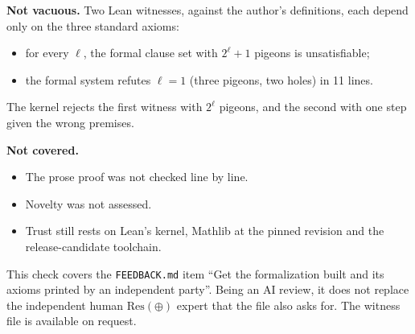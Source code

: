 \documentclass[10pt]{article}
\begin{document}
\textbf{Not vacuous.} Two Lean witnesses, against the author's definitions,
each depend only on the three standard axioms:
\begin{itemize}
\item for every $\ell$, the formal clause set with $2^\ell+1$ pigeons is
unsatisfiable;
\item the formal system refutes $\ell=1$ (three pigeons, two holes) in 11
lines.
\end{itemize}
The kernel rejects the first witness with $2^\ell$ pigeons, and the second
with one step given the wrong premises.

\textbf{Not covered.}
\begin{itemize}
\item The prose proof was not checked line by line.
\item Novelty was not assessed.
\item Trust still rests on Lean's kernel, Mathlib at the pinned revision and
the release-candidate toolchain.
\end{itemize}
This check covers the \texttt{FEEDBACK.md} item ``Get the formalization built
and its axioms printed by an independent party''. Being an AI review, it does
not replace the independent human $\mathrm{Res}(\oplus)$ expert that the file
also asks for. The witness file is available on request.
\end{document}
